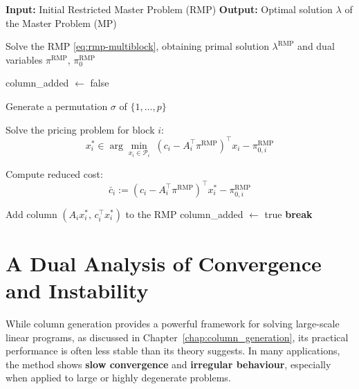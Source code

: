 \documentclass{book}
\theoremstyle{definition}
\newcounter{algorithm_}
\numberwithin{algorithm_}{chapter}
\begin{document}
\begin{tcolorbox}[colback=gray!10!white, colframe=gray!80!black,
title=Algorithm 1.3: Column Generation for Multi-Block Dantzig--Wolfe Master Problem,
sharp corners, boxrule=0.8pt]
{\small
\begin{algorithmic}[1]
\State \textbf{Input:} Initial Restricted Master Problem (RMP)
\State \textbf{Output:} Optimal solution $\lambda$ of the Master Problem (MP)

\Repeat
    \State Solve the RMP \eqref{eq:rmp-multiblock}, obtaining primal solution $\lambda^{\mathrm{RMP}}$ and dual variables $\pi^{\mathrm{RMP}}$, $\pi_0^{\mathrm{RMP}}$

    \State column\_added $\gets$ false
    
    \State Generate a permutation $\sigma$ of $\{1,\dots,p\}$


        \State Solve the pricing problem for block $i$:
        \[
        x_i^* \in \arg\min_{x_i \in \mathcal{P}_i}
        \; (c_i - A_i^\top \pi^{\mathrm{RMP}})^\top x_i - \pi_{0,i}^{\mathrm{RMP}}
        \]

        \State Compute reduced cost:
        \[
        \bar{c}_i := (c_i - A_i^\top \pi^{\mathrm{RMP}})^\top x_i^* - \pi_{0,i}^{\mathrm{RMP}}
        \]

            \State Add column $(A_i x_i^*,\, c_i^\top x_i^*)$ to the RMP
            \State column\_added $\gets$ true
            \State \textbf{break}
        \EndIf

    \EndFor


\end{algorithmic}
}
\label{alg:colgen_dw_multiblock}
\end{tcolorbox}





\chapter{A Dual Analysis of Convergence and Instability}
\label{chap: A Dual Analysis of Convergence and Instability}

\vspace*{\fill}

While column generation provides a powerful framework for solving large-scale linear programs, as discussed in Chapter~\ref{chap:column_generation}, its practical performance is often less stable than its theory suggests. In many applications, the method shows \textbf{slow convergence} and \textbf{irregular behaviour}, especially when applied to large or highly degenerate problems.
\end{document}
